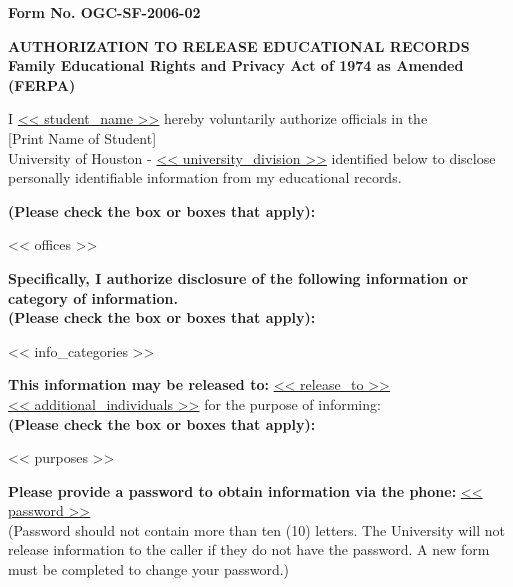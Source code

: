 \documentclass[12pt]{article}
\begin{document}
\noindent \textbf{Form No. OGC-SF-2006-02} %

\begin{center}
    {\fontsize{11pt}{13pt} \selectfont \textbf{AUTHORIZATION TO RELEASE EDUCATIONAL RECORDS}}\\
    {\fontsize{11pt}{13pt} \selectfont \textbf{Family Educational Rights and Privacy Act of 1974 as Amended (FERPA)}}
\end{center}

I \underline{<< student_name >>} hereby voluntarily authorize officials in the\\
\hspace{2cm} [Print Name of Student] \\

University of Houston - \underline{<< university_division >>} identified below to disclose personally identifiable information from my educational records.

\textbf{(Please check the box or boxes that apply):}
\begin{list}{}{\leftmargin=0pt \itemindent=0pt \setlength{\itemsep}{0pt}}
    << offices >>
\end{list}

\textbf{Specifically, I authorize disclosure of the following information or category of information.}\\
\textbf{(Please check the box or boxes that apply):}
\begin{list}{}{\leftmargin=0pt \itemindent=0pt \setlength{\itemsep}{0pt}}
    << info_categories >>
\end{list}

\textbf{This information may be released to:} \underline{<< release_to >>}\\
[Print Name(s) of Individual(s) To Whom University May Disclose Information]

\underline{<< additional_individuals >>} for the purpose of informing:\\
[List Additional Individuals if Necessary]

\textbf{(Please check the box or boxes that apply):}
\begin{list}{}{\leftmargin=0pt \itemindent=0pt \setlength{\itemsep}{0pt}}
    << purposes >>
\end{list}

\textbf{Please provide a password to obtain information via the phone:} \underline{<< password >>}\\
\footnotesize (Password should not contain more than ten (10) letters. The University will not release information to the caller if they do not have the password. A new form must be completed to change your password.)
\end{document}
